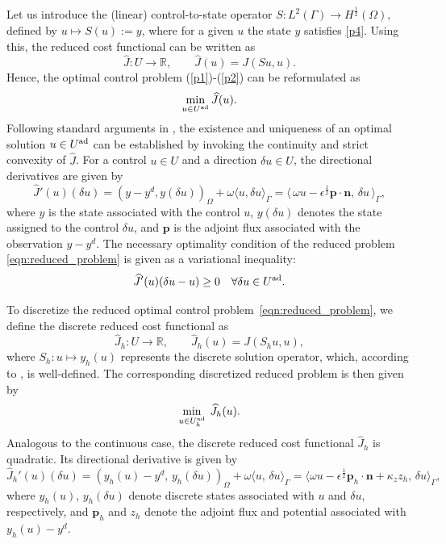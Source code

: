 \documentclass[a4paper,10pt]{article}
\newcommand{\Uad}{{U^{\textup{ad}}}}
\newcommand{\Uadh}{{U^{\textup{ad}}_h}}
\newcommand{\hF}{{\frac{1}{2}}}
\newcommand{\bp}{{\mathbf{p}}}
\newcommand{\bn}{{\mathbf{n}}}
\numberwithin{theorem}{section}
\newcommand{\x}[2][blue]{#2}
\newcommand{\z}[2][blue]{#2}
\begin{document}
Let us introduce the \z{(linear)} control-to-state operator
$
    S : L^2(\Gamma) \to H^{\hF}(\Omega),
$
defined by $u \mapsto S(u) := y$, where for a given $u$ the state $y$ satisfies \eqref{p4}. Using this, the reduced cost functional can be written as
\[
    \widehat J : U \to \mathbb{R}, 
    \qquad 
    \widehat J(u) = J(S u, u).
\]
Hence, the optimal control problem (\ref{p1})-(\ref{p2}) can be reformulated as
\begin{equation}\label{eqn:reduced_problem}
    \min_{u \in \Uad} \widehat J(u).
\end{equation}
Following standard arguments in \cite{JLLions_1971}, the existence and uniqueness of an optimal solution $u \in \Uad$ can be established by invoking the continuity and strict convexity of $\widehat J$. For a control $u \in U$ and a direction $\delta u \in U$, the directional derivatives are given by 
\begin{equation}\label{continuous_derivative}
 \widehat J'(u)(\delta u) = (y - y^d, y(\delta u))_\Omega + \omega \langle u, \delta u \rangle_{\Gamma} = \langle\, \omega u - \epsilon^{\hF} \mathbf{p}\cdot \bn,\, \delta u\, \rangle_{\Gamma},
\end{equation}
where $y$ is the state associated with the control $u$, $y(\delta u)$ denotes the state assigned to the control $\delta u$, and $\bp$ is the adjoint  flux associated with the observation $y-y^d$. The necessary  optimality condition of the reduced problem \eqref{eqn:reduced_problem} is given as a variational inequality:
\begin{equation}\label{reduced_cont_variational}
   \widehat J'(u)(\delta u - u) \geq 0 \quad \forall \delta u \in \Uad.
\end{equation}

To discretize the reduced optimal control problem~\eqref{eqn:reduced_problem}, 
we define the discrete reduced cost functional as
\[
    \widehat{J}_h : U \to \mathbb{R}, 
    \qquad 
    \widehat{J}_h(u) = J(S_h u,u),
\]
where $S_h : u \mapsto y_h(u)$ represents the discrete solution operator, which, according to \cite[Proposition 2.1]{PCastillo_BCockburn_IPergugia_DSchotzau_2000}, is well-defined. 
The corresponding discretized reduced problem is then given by
\begin{equation}\label{eqn:discrete_reduced_problem}
    \min_{u \in \Uadh} \; \widehat{J}_h(u).
\end{equation}
Analogous to the continuous case, the discrete reduced cost functional 
$\widehat{J}_h$ is quadratic. Its directional  derivative is given by
\begin{equation}\label{discrete_derivative}
    \widehat{J}_h'(u)(\delta u) 
    = (y_h(u) - y^d,\, y_h(\delta u))_{\Omega}
      + \omega \langle u,\, \delta u \rangle_{\Gamma} = \langle \omega u - \epsilon^{\hF} \bp_h \cdot \bn 
+ \kappa_z z_h, 
\, \delta u \rangle_{\Gamma},
\end{equation}
where $y_h(u)$, $y_h(\delta u)$ \x{denote} discrete states associated with $u$ and $\delta u$, respectively, and $\bp_h$ and $z_h$ denote the adjoint flux and potential associated with $y_h(u)-y^d$.
\end{document}
